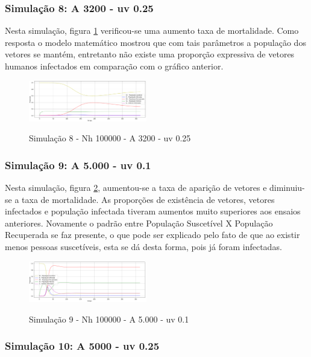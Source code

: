 \documentclass[conference]{IEEEtran}
\begin{document}
\subsubsection{Simulação 8: A 3200 - uv 0.25}

Nesta simulação, figura  \ref{fig:s8} verificou-se uma aumento taxa de mortalidade. Como resposta o modelo matemático mostrou que com tais parâmetros a população dos vetores se mantém, entretanto não existe uma proporção expressiva de vetores humanos infectados em comparação com o gráfico anterior. 
\\

\begin{figure}[!ht]
  \caption{Simulação 8 - Nh 100000 - A 3200 - uv 0.25}
  \includegraphics[width=0.46\textwidth]{Graf8.png}
  \label{fig:s8}
\end{figure}

\subsubsection{Simulação 9: A 5.000 - uv 0.1}

Nesta simulação, figura \ref{fig:s9}, aumentou-se a taxa de aparição de vetores e diminuiu-se a taxa de mortalidade. As proporções de existência de vetores, vetores infectados e população infectada tiveram aumentos muito superiores aos ensaios anteriores. Novamente o padrão entre População Suscetível X População Recuperada se faz presente, o que pode ser explicado pelo fato de que ao existir menos pessoas suscetíveis, esta se dá desta forma, pois já foram infectadas.
\\
\begin{figure}[!ht]
  \caption{Simulação 9 - Nh 100000 - A 5.000 - uv 0.1}
  \includegraphics[width=0.46\textwidth]{Graf9.png}
  \label{fig:s9}
\end{figure}


\subsubsection{Simulação 10: A 5000 - uv 0.25}
\end{document}
